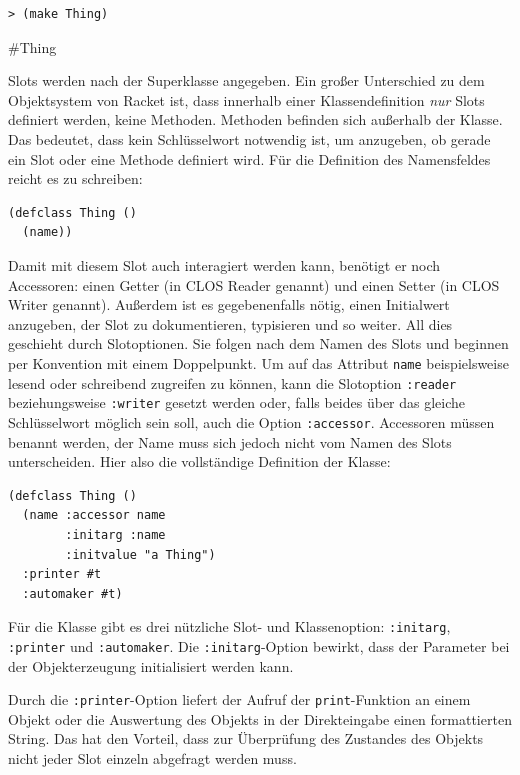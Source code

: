 \begin{lstlisting}
> (make Thing)
\end{lstlisting}
{\routput \#Thing}

Slots werden nach der Superklasse angegeben. Ein großer Unterschied zu dem Objektsystem von Racket ist, dass innerhalb einer Klassendefinition \textit{nur} Slots definiert werden, keine Methoden. Methoden befinden sich außerhalb der Klasse. Das bedeutet, dass kein Schlüsselwort notwendig ist, um anzugeben, ob gerade ein Slot oder eine Methode definiert wird. Für die Definition des Namensfeldes reicht es zu schreiben:

\begin{lstlisting}
(defclass Thing ()
  (name))
\end{lstlisting}


Damit mit diesem Slot auch interagiert werden kann, benötigt er noch Accessoren: einen Getter (in CLOS Reader genannt) und einen Setter (in CLOS Writer genannt). Außerdem  ist es gegebenenfalls nötig, einen Initialwert anzugeben, der Slot zu dokumentieren, typisieren und so weiter. All dies geschieht durch Slotoptionen. Sie folgen nach dem Namen des Slots und beginnen per Konvention mit einem Doppelpunkt. Um auf das Attribut \texttt{name} beispielsweise lesend oder schreibend zugreifen zu können, kann die Slotoption \texttt{:reader} beziehungsweise \texttt{:writer} gesetzt werden oder, falls beides über das gleiche Schlüsselwort möglich sein soll, auch die Option \texttt{:accessor}. Accessoren müssen benannt werden, der Name muss sich jedoch nicht vom Namen des Slots unterscheiden. Hier also die vollständige Definition der Klasse:

\begin{lstlisting}
(defclass Thing ()
  (name :accessor name
        :initarg :name
        :initvalue "a Thing")
  :printer #t
  :automaker #t)
\end{lstlisting}

Für die Klasse gibt es drei nützliche Slot- und Klassenoption: \texttt{:initarg}, \texttt{:printer} und \texttt{:automaker}. Die \texttt{:initarg}-Option bewirkt, dass der Parameter bei der Objekterzeugung initialisiert werden kann.

Durch die \texttt{:printer}-Option liefert der Aufruf der \texttt{print}-Funktion an einem Objekt oder die Auswertung des Objekts in der Direkteingabe einen formattierten String. Das hat den Vorteil, dass zur Überprüfung des Zustandes des Objekts nicht jeder Slot einzeln abgefragt werden muss.

